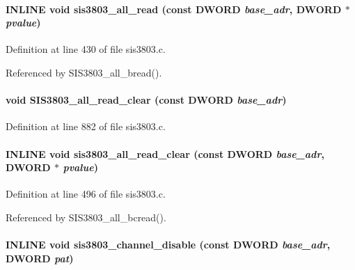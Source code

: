 \paragraph[{sis3803\_\-all\_\-read}]{\setlength{\rightskip}{0pt plus 5cm}INLINE void sis3803\_\-all\_\-read (const {\bf DWORD} {\em base\_\-adr}, \/  {\bf DWORD} $\ast$ {\em pvalue})}\hfill\label{sis3803_8c_a8a9df7e289de373c77eb9d4d2efde322}


Definition at line 430 of file sis3803.c.

Referenced by SIS3803\_\-all\_\-bread().
\paragraph[{SIS3803\_\-all\_\-read\_\-clear}]{\setlength{\rightskip}{0pt plus 5cm}void SIS3803\_\-all\_\-read\_\-clear (const {\bf DWORD} {\em base\_\-adr})}\hfill\label{sis3803_8c_a411df8e69ad186b0e10383ef75b86e11}


Definition at line 882 of file sis3803.c.
\paragraph[{sis3803\_\-all\_\-read\_\-clear}]{\setlength{\rightskip}{0pt plus 5cm}INLINE void sis3803\_\-all\_\-read\_\-clear (const {\bf DWORD} {\em base\_\-adr}, \/  {\bf DWORD} $\ast$ {\em pvalue})}\hfill\label{sis3803_8c_a0f63de1a1cbdcb74ad344536aa6aed14}


Definition at line 496 of file sis3803.c.

Referenced by SIS3803\_\-all\_\-bcread().
\paragraph[{sis3803\_\-channel\_\-disable}]{\setlength{\rightskip}{0pt plus 5cm}INLINE void sis3803\_\-channel\_\-disable (const {\bf DWORD} {\em base\_\-adr}, \/  {\bf DWORD} {\em pat})}\hfill\label{sis3803_8c_a463354edc9254520cdb43a17231ee629}


